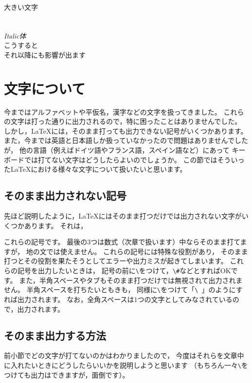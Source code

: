 \begin{IOTeX}
{\large 大きい文字} \\
 \\
{\large {}} \\
\textit{Italic体} \\
\huge こうすると \\
それ以降にも影響が出ます
\end{IOTeX}



\section{文字について}
今まではアルファベットや平仮名，漢字などの文字を扱ってきました。
これらの文字は打った通りに出力されるので，特に困ったことはありませんでした。
しかし，{\LaTeX}には，そのまま打っても出力できない記号がいくつかあります。
また，今までは英語と日本語しか扱っていなかったので問題はありませんでしたが，
他の言語（例えばドイツ語やフランス語，スペイン語など）にあって
キーボードでは打てない文字はどうしたらよいのでしょうか。
この節ではそういった{\LaTeX}における様々な文字について扱いたいと思います。


\subsection{そのまま出力されない記号}
先ほど説明したように，{\LaTeX}にはそのまま打つだけでは出力されない文字がいくつかあります。
それは，
\begin{ITeX}
# $ %
\end{ITeX}
これらの記号です。
最後の3つは数式（次章で扱います）中ならそのまま打てますが，
地の文では使えません。
これらの記号には特殊な役割があり，
そのまま打つとその役割を果たそうとしてエラーや出力ミスが起きてしまいます。
これらの記号を出力したいときは，
記号の前に\verb|\|をつけて，\verb|\#|などとすればOKです。
また，半角スペースやタブもそのまま打つだけでは無視されて出力されません。
半角スペースを打ちたいともきも，
同様に\verb|\|をつけて「\verb*|\ |」のようにすれば出力されます。
なお，全角スペースは1つの文字としてみなされているので，出力されます。


\subsection{そのまま出力する方法}
前小節でどの文字が打てないのかはわかりましたので，
今度はそれらを文章中に入れたいときにどうしたらいいかを説明しようと思います
（もちろん一々\verb|\|をつけても出力はできますが，面倒です）。

